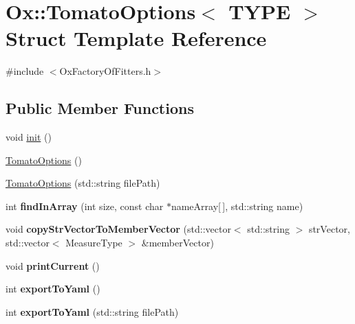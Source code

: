 \hypertarget{struct_ox_1_1_tomato_options}{\section{Ox\-:\-:Tomato\-Options$<$ T\-Y\-P\-E $>$ Struct Template Reference}
\label{struct_ox_1_1_tomato_options}
}


{\ttfamily \#include $<$Ox\-Factory\-Of\-Fitters.\-h$>$}

\subsection*{Public Member Functions}
\begin{DoxyCompactItemize}
\item 
void \hyperlink{struct_ox_1_1_tomato_options_a76497b53cadad720af7ff0f83b99096b}{init} ()
\item 
\hyperlink{struct_ox_1_1_tomato_options_a974a7659d7eaefe712b1bb00cbd46a93}{Tomato\-Options} ()
\item 
\hyperlink{struct_ox_1_1_tomato_options_abd502ef8966b09c671e2b7a5b565ce38}{Tomato\-Options} (std\-::string file\-Path)
\item 
\hypertarget{struct_ox_1_1_tomato_options_a9630620338003eb675fdfe242449c915}{int {\bfseries find\-In\-Array} (int size, const char $\ast$name\-Array\mbox{[}$\,$\mbox{]}, std\-::string name)}\label{struct_ox_1_1_tomato_options_a9630620338003eb675fdfe242449c915}

\item 
\hypertarget{struct_ox_1_1_tomato_options_a7c4177f7ae9b1d267a3a87088651570a}{void {\bfseries copy\-Str\-Vector\-To\-Member\-Vector} (std\-::vector$<$ std\-::string $>$ str\-Vector, std\-::vector$<$ Measure\-Type $>$ \&member\-Vector)}\label{struct_ox_1_1_tomato_options_a7c4177f7ae9b1d267a3a87088651570a}

\item 
\hypertarget{struct_ox_1_1_tomato_options_ab50a9d1d7044fa64878b9b7141fd4c81}{void {\bfseries print\-Current} ()}\label{struct_ox_1_1_tomato_options_ab50a9d1d7044fa64878b9b7141fd4c81}

\item 
\hypertarget{struct_ox_1_1_tomato_options_a8c763b89efcc2122205363a7e743afa9}{int {\bfseries export\-To\-Yaml} ()}\label{struct_ox_1_1_tomato_options_a8c763b89efcc2122205363a7e743afa9}

\item 
\hypertarget{struct_ox_1_1_tomato_options_a858797a020bbb2504cfcf389bec9bca2}{int {\bfseries export\-To\-Yaml} (std\-::string file\-Path)}\label{struct_ox_1_1_tomato_options_a858797a020bbb2504cfcf389bec9bca2}

\end{DoxyCompactItemize}
